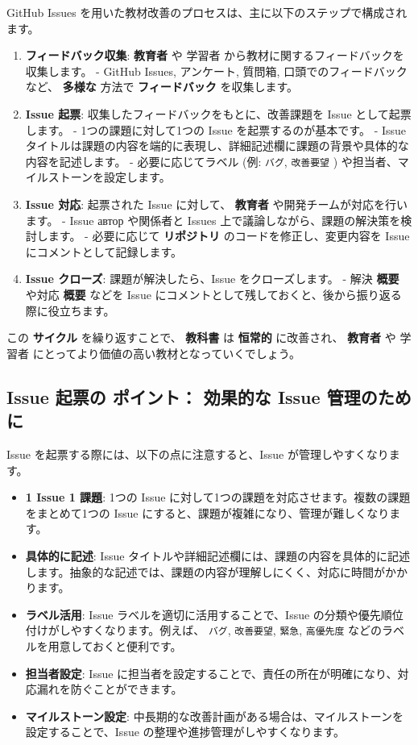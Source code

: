 GitHub Issues を用いた教材改善のプロセスは、主に以下のステップで構成されます。

\begin{enumerate}
    \item \textbf{フィードバック収集}: \textbf{教育者} や 学習者 から教材に関するフィードバックを収集します。
        - GitHub Issues, アンケート, 質問箱, 口頭でのフィードバックなど、 \textbf{多様な} 方法で \textbf{フィードバック} を収集します。
    \item \textbf{Issue 起票}: 収集したフィードバックをもとに、改善課題を Issue として起票します。
        - 1つの課題に対して1つの Issue を起票するのが基本です。
        - Issue タイトルは課題の内容を端的に表現し、詳細記述欄に課題の背景や具体的な内容を記述します。
        - 必要に応じてラベル (例: \texttt{バグ}, \texttt{改善要望} ) や担当者、マイルストーンを設定します。
    \item \textbf{Issue 対応}: 起票された Issue に対して、 \textbf{教育者} や開発チームが対応を行います。
        - Issue автор や関係者と Issues 上で議論しながら、課題の解決策を検討します。
        - 必要に応じて \textbf{リポジトリ} のコードを修正し、変更内容を Issue にコメントとして記録します。
    \item \textbf{Issue クローズ}: 課題が解決したら、Issue をクローズします。
        - 解決 \textbf{概要} や対応 \textbf{概要} などを Issue にコメントとして残しておくと、後から振り返る際に役立ちます。
\end{enumerate}

この \textbf{サイクル} を繰り返すことで、 \textbf{教科書} は \textbf{恒常的} に改善され、 \textbf{教育者} や 学習者 にとってより価値の高い教材となっていくでしょう。

\subsection{Issue 起票の ポイント： \textbf{効果的な} Issue 管理のために}

Issue を起票する際には、以下の点に注意すると、Issue が管理しやすくなります。

\begin{itemize}
    \item \textbf{1 Issue 1 課題}: 1つの Issue に対して1つの課題を対応させます。複数の課題をまとめて1つの Issue にすると、課題が複雑になり、管理が難しくなります。
    \item \textbf{具体的に記述}: Issue タイトルや詳細記述欄には、課題の内容を具体的に記述します。抽象的な記述では、課題の内容が理解しにくく、対応に時間がかかります。
    \item \textbf{ラベル活用}: Issue ラベルを適切に活用することで、Issue の分類や優先順位付けがしやすくなります。例えば、 \texttt{バグ}, \texttt{改善要望}, \texttt{緊急}, \texttt{高優先度} などのラベルを用意しておくと便利です。
    \item \textbf{担当者設定}: Issue に担当者を設定することで、責任の所在が明確になり、対応漏れを防ぐことができます。
    \item \textbf{マイルストーン設定}: 中長期的な改善計画がある場合は、マイルストーンを設定することで、Issue の整理や進捗管理がしやすくなります。
\end{itemize}


